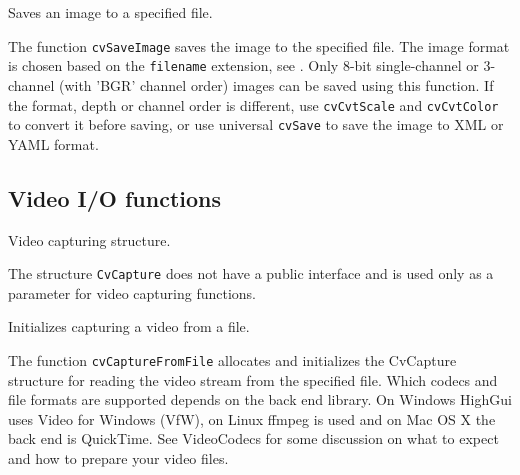 
Saves an image to a specified file.


\begin{description}
\end{description}

The function \texttt{cvSaveImage} saves the image to the specified file. The image format is chosen based on the \texttt{filename} extension, see . Only 8-bit single-channel or 3-channel (with 'BGR' channel order) images can be saved using this function. If the format, depth or channel order is different, use \texttt{cvCvtScale} and \texttt{cvCvtColor} to convert it before saving, or use universal \texttt{cvSave} to save the image to XML or YAML format.

\subsection{Video I/O functions}

\label{CvCapture}

Video capturing structure.

\ifC
{}
\fi

The structure \texttt{CvCapture} does not have a public interface and is used only as a parameter for video capturing functions.


Initializes capturing a video from a file.


\begin{description}
\end{description}

The function \texttt{cvCaptureFromFile} allocates and initializes the CvCapture structure for reading the video stream from the specified file. Which codecs and file formats are supported depends on the back end library. On Windows HighGui uses Video for Windows (VfW), on Linux ffmpeg is used and on Mac OS X the back end is QuickTime. See VideoCodecs for some discussion on what to expect and how to prepare your video files.

